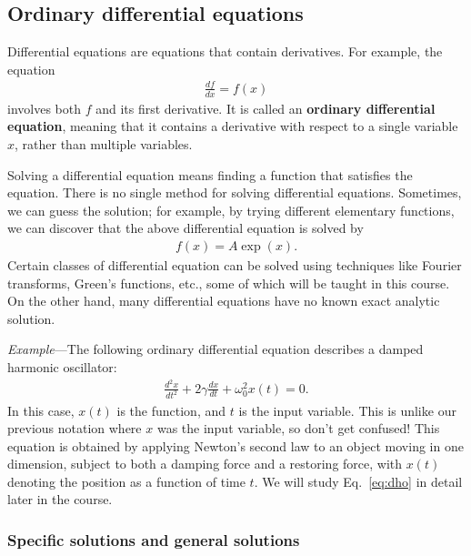 \documentclass[10pt,a4paper]{article}
\begin{document}
\subsection{Ordinary differential equations}
\label{ordinary-differential-equations}

Differential equations are equations that contain derivatives.  For
example, the equation
\begin{align}
  \frac{df}{dx} = f(x)
\end{align}
involves both $f$ and its first derivative. It is called an
\textbf{ordinary differential equation}, meaning that it contains a
derivative with respect to a single variable $x$, rather than multiple
variables.

Solving a differential equation means finding a function that
satisfies the equation. There is no single method for solving
differential equations.  Sometimes, we can guess the solution; for
example, by trying different elementary functions, we can discover
that the above differential equation is solved by
\begin{align}
  f(x) = A \exp(x).
\end{align}
Certain classes of differential equation can be solved using
techniques like Fourier transforms, Green's functions, etc., some of
which will be taught in this course. On the other hand, many
differential equations have no known exact analytic solution.

\clearpage

\begin{framed}\noindent
  \textit{Example}---The following ordinary differential equation
  describes a damped harmonic oscillator:
  \begin{align}
    \frac{d^2 x}{dt^2} + 2\gamma\frac{dx}{dt} + \omega_0^2 x(t) = 0.
    \label{eq:dho}
  \end{align}
  In this case, $x(t)$ is the function, and $t$ is the input
  variable. This is unlike our previous notation where $x$ was the
  input variable, so don't get confused! This equation is obtained by
  applying Newton's second law to an object moving in one dimension,
  subject to both a damping force and a restoring force, with $x(t)$
  denoting the position as a function of time $t$.  We will study
  Eq.~\eqref{eq:dho} in detail later in the course.
\end{framed}

\subsubsection{Specific solutions and general solutions}
\label{specific-solutions-and-general-solutions}
\end{document}
